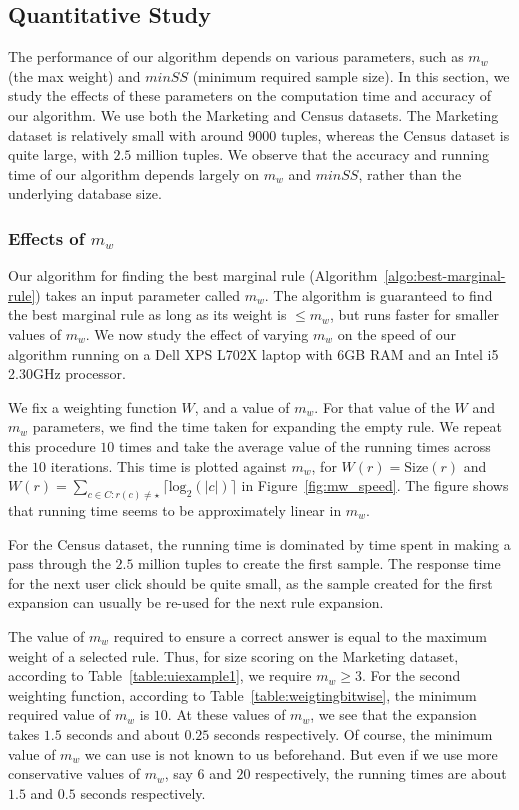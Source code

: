 
\subsection{Quantitative Study}\label{sec:quantitative_study}
The performance of our algorithm depends on various parameters, such as $m_w$ (the max weight) and $minSS$ (minimum required sample size). In this section, we study the effects of these parameters on the computation time and accuracy of our algorithm. We use both the Marketing and Census datasets. The Marketing dataset is relatively small with around $9000$ tuples, whereas the Census dataset is quite large, with $2.5$ million tuples. We observe that the accuracy and running time of our algorithm depends largely on $m_w$ and $minSS$, rather than the underlying database size.

\subsubsection{Effects of $m_w$}
Our algorithm for finding the best marginal rule (Algorithm~\ref{algo:best-marginal-rule}) takes an input parameter called $m_w$. The algorithm is guaranteed to find the best marginal rule as long as its weight is $\leq m_w$, but runs faster for smaller values of $m_w$. We now study the effect of varying $m_w$ on the speed of our algorithm running on a Dell XPS L702X laptop with 6GB RAM and an Intel i5 2.30GHz processor.

We fix a weighting function $W$, and a value of $m_w$. For that value of the $W$ and $m_w$ parameters, we find the time taken for expanding the empty rule. We repeat this procedure $10$ times and take the average value of the running times across the $10$ iterations. This time is plotted against $m_w$, for $W(r) = \text{Size}(r)$ and $W(r) = \sum_{c \in C : r(c) \neq \star} \lceil \text{log}_2(|c|) \rceil$ in Figure~\ref{fig:mw_speed}. The figure shows that running time seems to be approximately linear in $m_w$. 

For the Census dataset, the running time is dominated by time spent in making a pass through the $2.5$ million tuples to create the first sample. The response time for the next user click should be quite small, as the sample created for the first expansion can usually be re-used for the next rule expansion.

The value of $m_w$ required to ensure a correct answer is equal to the maximum weight of a selected rule. Thus, for size scoring on the Marketing dataset, according to Table~\ref{table:uiexample1}, we require $m_w \geq 3$. For the second weighting function, according to Table~\ref{table:weigtingbitwise}, the minimum required value of $m_w$ is $10$. At these values of $m_w$, we see that the expansion takes $1.5$ seconds and about $0.25$ seconds respectively. Of course, the minimum value of $m_w$ we can use is not known to us beforehand. But even if we use more conservative values of $m_w$, say $6$ and $20$ respectively, the running times are about $1.5$ and $0.5$ seconds respectively.

